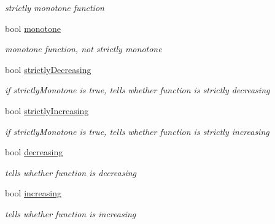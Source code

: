 \begin{DoxyCompactItemize}
\begin{DoxyCompactList}\small\item\em strictly monotone function \end{DoxyCompactList}\item 
\hypertarget{class_opm_1_1_monot_cubic_interpolator_ae15b2de33cee75db27ce8dc2f1749a74}{}bool \hyperlink{class_opm_1_1_monot_cubic_interpolator_ae15b2de33cee75db27ce8dc2f1749a74}{monotone}\label{class_opm_1_1_monot_cubic_interpolator_ae15b2de33cee75db27ce8dc2f1749a74}

\begin{DoxyCompactList}\small\item\em monotone function, not strictly monotone \end{DoxyCompactList}\item 
\hypertarget{class_opm_1_1_monot_cubic_interpolator_aa619585bf1668674e7706dbd70d8e164}{}bool \hyperlink{class_opm_1_1_monot_cubic_interpolator_aa619585bf1668674e7706dbd70d8e164}{strictly\+Decreasing}\label{class_opm_1_1_monot_cubic_interpolator_aa619585bf1668674e7706dbd70d8e164}

\begin{DoxyCompactList}\small\item\em if strictly\+Monotone is true, tells whether function is strictly decreasing \end{DoxyCompactList}\item 
\hypertarget{class_opm_1_1_monot_cubic_interpolator_abd2aa7ffd6729b9bf4aacf706e29cf9e}{}bool \hyperlink{class_opm_1_1_monot_cubic_interpolator_abd2aa7ffd6729b9bf4aacf706e29cf9e}{strictly\+Increasing}\label{class_opm_1_1_monot_cubic_interpolator_abd2aa7ffd6729b9bf4aacf706e29cf9e}

\begin{DoxyCompactList}\small\item\em if strictly\+Monotone is true, tells whether function is strictly increasing \end{DoxyCompactList}\item 
\hypertarget{class_opm_1_1_monot_cubic_interpolator_ab30db3bdd5b15213be0ba594fbae69a1}{}bool \hyperlink{class_opm_1_1_monot_cubic_interpolator_ab30db3bdd5b15213be0ba594fbae69a1}{decreasing}\label{class_opm_1_1_monot_cubic_interpolator_ab30db3bdd5b15213be0ba594fbae69a1}

\begin{DoxyCompactList}\small\item\em tells whether function is decreasing \end{DoxyCompactList}\item 
\hypertarget{class_opm_1_1_monot_cubic_interpolator_a01c003d595168786fea3c3896754134e}{}bool \hyperlink{class_opm_1_1_monot_cubic_interpolator_a01c003d595168786fea3c3896754134e}{increasing}\label{class_opm_1_1_monot_cubic_interpolator_a01c003d595168786fea3c3896754134e}

\begin{DoxyCompactList}\small\item\em tells whether function is increasing \end{DoxyCompactList}\end{DoxyCompactItemize}



